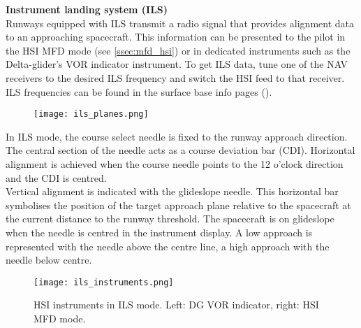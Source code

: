 \documentclass[Orbiter User Manual.tex]{subfiles}
\begin{document}
\noindent
\textbf{Instrument landing system (ILS)}\\
Runways equipped with ILS transmit a radio signal that provides alignment data to an approaching spacecraft. This information can be presented to the pilot in the HSI MFD mode (see \ref{ssec:mfd_hsi}) or in dedicated instruments such as the Delta-glider's VOR indicator instrument. To get ILS data, tune one of the NAV receivers to the desired ILS frequency and switch the HSI feed to that receiver. ILS frequencies can be found in the surface base info pages (\Ctrl{}).

\begin{figure}[H]
	\centering
	\texttt{[image: ils\_planes.png]}
\end{figure}

\noindent
In ILS mode, the course select needle is fixed to the runway approach direction. The central section of the needle acts as a course deviation bar (CDI). Horizontal alignment is achieved when the course needle points to the 12 o'clock direction and the CDI is centred.\\
Vertical alignment is indicated with the glideslope needle. This horizontal bar symbolises the position of the target approach plane relative to the spacecraft at the current distance to the runway threshold. The spacecraft is on glideslope when the needle is centred in the instrument display. A low approach is represented with the needle above the centre line, a high approach with the needle below centre.

\begin{figure}[H]
	\centering
	\texttt{[image: ils\_instruments.png]}
	\caption{HSI instruments in ILS mode. Left: DG VOR indicator, right: HSI MFD mode.}
\end{figure}
\end{document}
